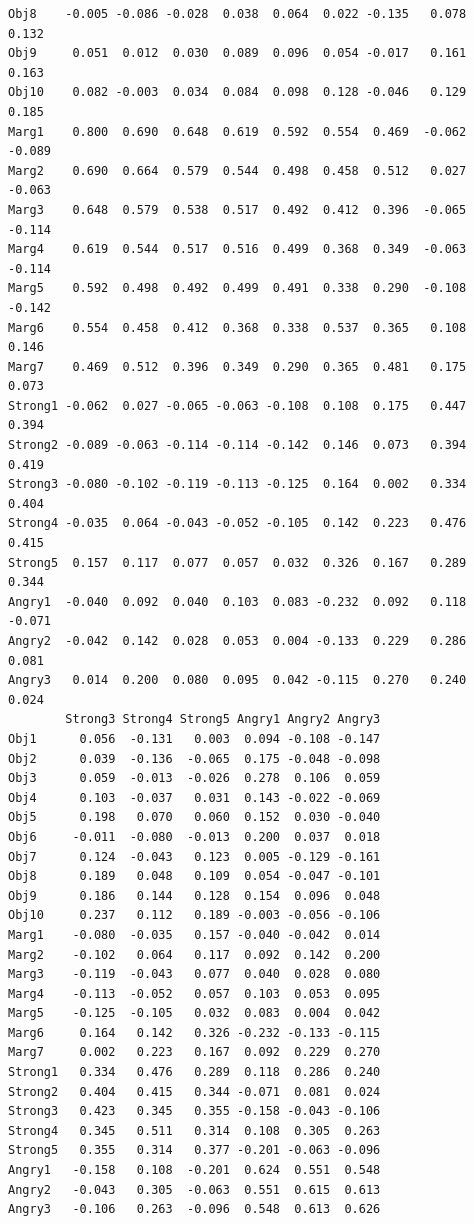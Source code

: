 \documentclass[
  english,
]{book}
\begin{document}
\begin{verbatim}
Obj8    -0.005 -0.086 -0.028  0.038  0.064  0.022 -0.135   0.078   0.132
Obj9     0.051  0.012  0.030  0.089  0.096  0.054 -0.017   0.161   0.163
Obj10    0.082 -0.003  0.034  0.084  0.098  0.128 -0.046   0.129   0.185
Marg1    0.800  0.690  0.648  0.619  0.592  0.554  0.469  -0.062  -0.089
Marg2    0.690  0.664  0.579  0.544  0.498  0.458  0.512   0.027  -0.063
Marg3    0.648  0.579  0.538  0.517  0.492  0.412  0.396  -0.065  -0.114
Marg4    0.619  0.544  0.517  0.516  0.499  0.368  0.349  -0.063  -0.114
Marg5    0.592  0.498  0.492  0.499  0.491  0.338  0.290  -0.108  -0.142
Marg6    0.554  0.458  0.412  0.368  0.338  0.537  0.365   0.108   0.146
Marg7    0.469  0.512  0.396  0.349  0.290  0.365  0.481   0.175   0.073
Strong1 -0.062  0.027 -0.065 -0.063 -0.108  0.108  0.175   0.447   0.394
Strong2 -0.089 -0.063 -0.114 -0.114 -0.142  0.146  0.073   0.394   0.419
Strong3 -0.080 -0.102 -0.119 -0.113 -0.125  0.164  0.002   0.334   0.404
Strong4 -0.035  0.064 -0.043 -0.052 -0.105  0.142  0.223   0.476   0.415
Strong5  0.157  0.117  0.077  0.057  0.032  0.326  0.167   0.289   0.344
Angry1  -0.040  0.092  0.040  0.103  0.083 -0.232  0.092   0.118  -0.071
Angry2  -0.042  0.142  0.028  0.053  0.004 -0.133  0.229   0.286   0.081
Angry3   0.014  0.200  0.080  0.095  0.042 -0.115  0.270   0.240   0.024
        Strong3 Strong4 Strong5 Angry1 Angry2 Angry3
Obj1      0.056  -0.131   0.003  0.094 -0.108 -0.147
Obj2      0.039  -0.136  -0.065  0.175 -0.048 -0.098
Obj3      0.059  -0.013  -0.026  0.278  0.106  0.059
Obj4      0.103  -0.037   0.031  0.143 -0.022 -0.069
Obj5      0.198   0.070   0.060  0.152  0.030 -0.040
Obj6     -0.011  -0.080  -0.013  0.200  0.037  0.018
Obj7      0.124  -0.043   0.123  0.005 -0.129 -0.161
Obj8      0.189   0.048   0.109  0.054 -0.047 -0.101
Obj9      0.186   0.144   0.128  0.154  0.096  0.048
Obj10     0.237   0.112   0.189 -0.003 -0.056 -0.106
Marg1    -0.080  -0.035   0.157 -0.040 -0.042  0.014
Marg2    -0.102   0.064   0.117  0.092  0.142  0.200
Marg3    -0.119  -0.043   0.077  0.040  0.028  0.080
Marg4    -0.113  -0.052   0.057  0.103  0.053  0.095
Marg5    -0.125  -0.105   0.032  0.083  0.004  0.042
Marg6     0.164   0.142   0.326 -0.232 -0.133 -0.115
Marg7     0.002   0.223   0.167  0.092  0.229  0.270
Strong1   0.334   0.476   0.289  0.118  0.286  0.240
Strong2   0.404   0.415   0.344 -0.071  0.081  0.024
Strong3   0.423   0.345   0.355 -0.158 -0.043 -0.106
Strong4   0.345   0.511   0.314  0.108  0.305  0.263
Strong5   0.355   0.314   0.377 -0.201 -0.063 -0.096
Angry1   -0.158   0.108  -0.201  0.624  0.551  0.548
Angry2   -0.043   0.305  -0.063  0.551  0.615  0.613
Angry3   -0.106   0.263  -0.096  0.548  0.613  0.626
\end{verbatim}
\end{document}
